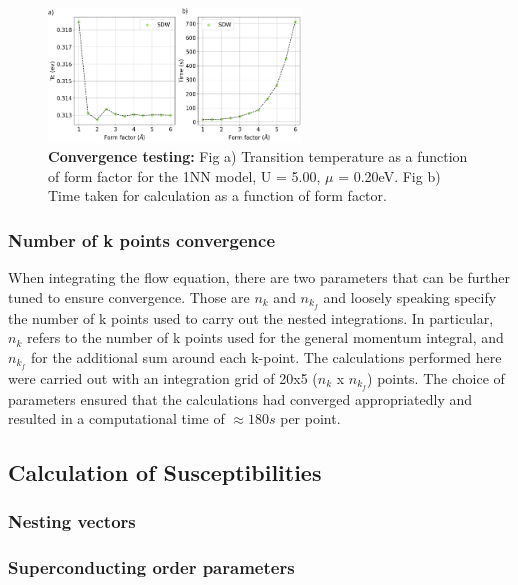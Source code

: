 \documentclass[12pt]{article}
\begin{document}
\begin{figure}[htbp]  %
    \centering
    \includegraphics[width=0.6\textwidth]{convergence.png}  %
    \caption{\textbf{Convergence testing:} Fig a) Transition temperature as a function of form factor for the 1NN model, U = 5.00, $\mu$ = 0.20eV. Fig b) Time taken for calculation
    as a function of form factor.   }
    \label{fig:Formfactorconvergence}
\end{figure}

\newpage





\subsubsection{Number of k points convergence }

When integrating the flow equation, there are two parameters that can be further tuned to ensure convergence.
Those are $n_k$ and $n_{k_f}$ and  loosely speaking specify the number of k points used to carry out the nested integrations. 
In particular, $n_k$ refers to the number of k points used for the general momentum integral, and $n_{k_f}$ for 
the additional sum around each k-point. The calculations performed here were carried out with an integration 
grid of 20x5 ($n_k$ x $n_{k_f}$) points. The choice of parameters ensured that the calculations had converged appropriatedly 
and resulted in a computational time of $\approx 180s$ per point. 

\subsection{Calculation of Susceptibilities}

\subsubsection{Nesting vectors}

\subsubsection{Superconducting order parameters}
\end{document}
